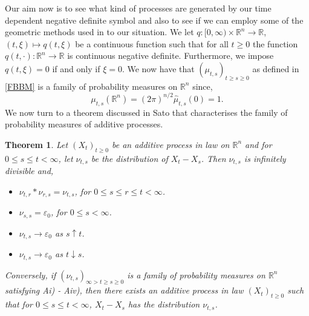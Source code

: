 \documentclass[a4paper, 12pt]{report}
\newtheorem{theorem}{Theorem}[section]
\theoremstyle{remark}
\theoremstyle{definition}
\begin{document}
Our aim now is to see what kind of processes are generated by our time dependent negative definite symbol and also to see if we can employ some of the geometric methods used in \cite{Paper} to our situation.  We let $q : [0, \infty) \times \mathbb{R}^n \to \mathbb{R}$, $(t, \xi) \mapsto q(t, \xi)$ be a continuous function such that for all $t \ge 0$ the function $q(t, \cdot) : \mathbb{R}^n \to \mathbb{R}$ is continuous negative definite.  Furthermore, we impose $q(t, \xi) = 0$ if and only if $\xi = 0$.  We now have that $(\mu_{t, s})_{t \ge s \ge 0}$ as defined in \eqref{FBBM} is a family of probability measures on $\mathbb{R}^n$ since,
$$
\mu_{t, s}(\mathbb{R}^n) = (2\pi)^{n/2}\hat{\mu}_{t, s}(0) = 1.
$$
We now turn to a theorem discussed in Sato \cite{Sato} that characterises the family of probability measures of additive processes.

\begin{theorem}\label{APfromTDCNDF}
Let $(X_t)_{t \ge 0}$ be an additive process in law on $\mathbb{R}^n$ and for $0 \le s \le t < \infty$, let $\nu_{t, s}$ be the distribution of $X_t - X_s$.  Then $\nu_{t, s}$ is infinitely divisible and,
\begin{itemize}

\item[Ai)] $\nu_{t, r}\ast\nu_{r, s} = \nu_{t, s}$, for $0 \le s \le r \le t < \infty$.

\item[Aii)] $\nu_{s, s} = \varepsilon_0$, for $0 \le s < \infty$.

\item[Aiii)] $\nu_{t, s} \to \varepsilon_0$ as $s \uparrow t$.

\item[Aiv)] $\nu_{t, s} \to \varepsilon_0$ as $t \downarrow s$.

\end{itemize}

Conversely, if $(\nu_{t, s})_{\infty > t \ge s \ge 0}$ is a family of probability measures on $\mathbb{R}^n$ satisfying Ai) - Aiv), then there exists an additive process in law $(X_t)_{t \ge 0}$ such that for $0 \le s \le t < \infty$, $X_t - X_s$ has the distribution $\nu_{t, s}$.
\end{theorem}
\end{document}
